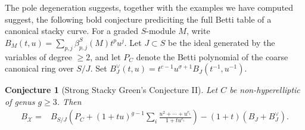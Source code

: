 \documentclass[11pt,reqno]{amsart}
\newtheorem{conjecture}[lemma]{Conjecture}
\theoremstyle{remark}
\newcommand{\cX}{\mathcal{X}}
\begin{document}
The pole degeneration suggests, together with the examples we have computed suggest, the following bold conjecture prediciting the full Betti table of a canonical stacky curve. For a graded $S$-module $M$, write $B_M(t,u)=\sum_{p,j}\beta^S_{p,j}(M)t^pu^j$. Let $J\subset S$ be the ideal generated by the variables of degree $\geq 2$, and let $P_C$ denote the Betti polynomial of the coarse canonical ring over $S/J$. Set $B_J^\vee(t,u)=t^{c-1}u^{\sigma+1}B_J(t^{-1},u^{-1})$.

\begin{conjecture}[Strong Stacky Green's Conjecture II]\label{conj:middle}
Let $C$ be non-hyperelliptic of genus $g\geq3$. Then
\[
\begin{aligned}
B_\cX
={}&B_{S/J}\left(
P_C+(1+tu)^{g-1}
\sum_i\frac{u^2+\cdots+u^{e_i}}{1+tu^{e_i}}
\right)-(1+t)(B_J+B_J^\vee).
\end{aligned}
\]
\end{conjecture}
\end{document}
